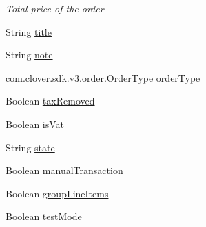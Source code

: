 \begin{DoxyCompactItemize}
\begin{DoxyCompactList}\small\item\em Total price of the order \end{DoxyCompactList}\item 
String \hyperlink{classcom_1_1clover_1_1sdk_1_1v3_1_1order_1_1_order_a842ffaf6366fc7c96e0cbb25b8ad70ed}{title}
\item 
String \hyperlink{classcom_1_1clover_1_1sdk_1_1v3_1_1order_1_1_order_af7d9a06c49abc326cd5c9ef604d92a2a}{note}
\item 
\hyperlink{classcom_1_1clover_1_1sdk_1_1v3_1_1order_1_1_order_type}{com.\+clover.\+sdk.\+v3.\+order.\+Order\+Type} \hyperlink{classcom_1_1clover_1_1sdk_1_1v3_1_1order_1_1_order_ac40fd7c3baf54fd9e2c4347a2d2a41f2}{order\+Type}
\item 
Boolean \hyperlink{classcom_1_1clover_1_1sdk_1_1v3_1_1order_1_1_order_a0169c553effdb8334b8e5e281a626b7a}{tax\+Removed}
\item 
Boolean \hyperlink{classcom_1_1clover_1_1sdk_1_1v3_1_1order_1_1_order_a55e205d257fb45b70499aa199692c59b}{is\+Vat}
\item 
String \hyperlink{classcom_1_1clover_1_1sdk_1_1v3_1_1order_1_1_order_a8d380a77a61759a7954f5222b6494f8e}{state}
\item 
Boolean \hyperlink{classcom_1_1clover_1_1sdk_1_1v3_1_1order_1_1_order_ada8dad56989062fc1d9475dec0bc81d5}{manual\+Transaction}
\item 
Boolean \hyperlink{classcom_1_1clover_1_1sdk_1_1v3_1_1order_1_1_order_a410f6f3366dd1c50ee61135b5f0657d2}{group\+Line\+Items}
\item 
Boolean \hyperlink{classcom_1_1clover_1_1sdk_1_1v3_1_1order_1_1_order_a8aff2eb87b010e02f73fab38b40a447a}{test\+Mode}

\end{DoxyCompactItemize}
